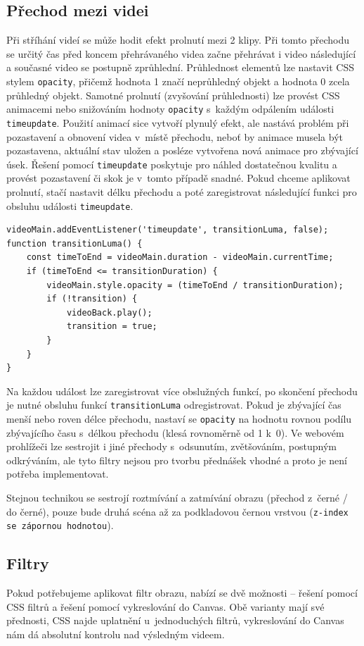 \subsection{Přechod mezi videi}
Při stříhání videí se může hodit efekt prolnutí mezi 2 klipy. Při tomto přechodu se určitý čas před koncem přehrávaného videa začne přehrávat i video následující a současné video se postupně zprůhlední. Průhlednost elementů lze nastavit CSS stylem \texttt{opacity}, přičemž hodnota 1 značí neprůhledný objekt a hodnota 0 zcela průhledný objekt. Samotné prolnutí (zvyšování průhlednosti) lze provést CSS animacemi nebo snižováním hodnoty \texttt{opacity} s~každým odpálením události \texttt{timeupdate}. Použití animací sice vytvoří plynulý efekt, ale nastává problém při pozastavení a obnovení videa v~místě přechodu, neboť by animace musela být pozastavena, aktuální stav uložen a posléze vytvořena nová animace pro zbývající úsek. Řešení pomocí \texttt{timeupdate} poskytuje pro náhled dostatečnou kvalitu a provést pozastavení či skok je v~tomto případě snadné. Pokud chceme aplikovat prolnutí, stačí nastavit délku přechodu a poté zaregistrovat následující funkci pro obsluhu události \texttt{timeupdate}.
\begin{lstlisting}[style=JavaScript]
videoMain.addEventListener('timeupdate', transitionLuma, false);
function transitionLuma() {
    const timeToEnd = videoMain.duration - videoMain.currentTime;
    if (timeToEnd <= transitionDuration) {
        videoMain.style.opacity = (timeToEnd / transitionDuration);
        if (!transition) {
            videoBack.play();
            transition = true;
        }
    }
}
\end{lstlisting}
Na každou událost lze zaregistrovat více obslužných funkcí, po skončení přechodu je nutné obsluhu funkcí \texttt{transitionLuma} odregistrovat. Pokud je zbývající čas menší nebo roven délce přechodu, nastaví se \texttt{opacity} na hodnotu rovnou podílu zbývajícího času s~délkou přechodu (klesá rovnoměrně od 1 k~0). Ve webovém prohlížeči lze sestrojit i jiné přechody s~odsunutím, zvětšováním, postupným odkrýváním, ale tyto filtry nejsou pro tvorbu přednášek vhodné a proto je není potřeba implementovat.

Stejnou technikou se sestrojí roztmívání a zatmívání obrazu (přechod z~černé / do černé), pouze bude druhá scéna až za podkladovou černou vrstvou (\texttt{z-index se zápornou hodnotou}).

\subsection{Filtry}
Pokud potřebujeme aplikovat filtr obrazu, nabízí se dvě možnosti -- řešení pomocí CSS filtrů a řešení pomocí vykreslování do Canvas. Obě varianty mají své přednosti, CSS najde uplatnění u~jednoduchých filtrů, vykreslování do Canvas nám dá absolutní kontrolu nad výsledným videem.


